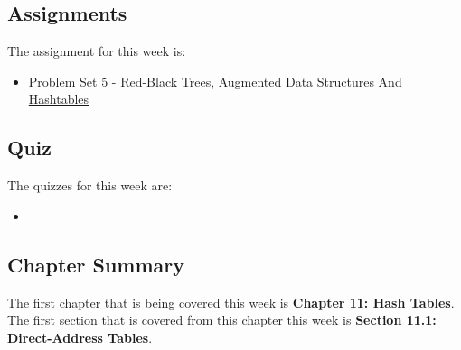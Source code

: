 \subsection{Assignments}

The assignment for this week is:

\begin{itemize}
    \item \href{https://github.com/QuantumCompiler/CU/tree/main/CSPB%203104%20-%20Algorithms/Assignments/Problem%20Sets/Problem%20Set%205%20-%20Red-Black%20Trees%2C%20Augmented%20Data%20Structures%20And%20Hashtables}{Problem Set 5 - Red-Black Trees, Augmented Data Structures And Hashtables}
\end{itemize}

\subsection{Quiz}

The quizzes for this week are:

\begin{itemize}
    \item {}
\end{itemize}

\subsection{Chapter Summary}

The first chapter that is being covered this week is \textbf{Chapter 11: Hash Tables}. The first section that is covered from this chapter this week is \textbf{Section 11.1: Direct-Address Tables}.

